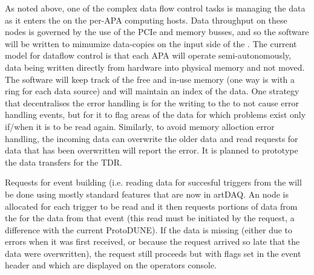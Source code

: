 As noted above, one of the complex data flow control tasks is managing
the data as it enters the  on the per-APA 
computing hosts. 
Data throughput on these nodes is governed by the use of the PCIe and
memory busses, and so the software will be written to mimumize
data-copies on the input side of the .
The current model for dataflow control is that each APA will operate
semi-autonomously, data being written directly from hardware into physical
memory and not moved. 
The software will keep track of the free and in-use memory (one way is
with a ring for each data source) and will maintain an index of the
data. 
One strategy that decentralises the error handling is for the writing
to the  to not cause error handling events, but
for it to flag areas of the data for which problems exist only if/when
it is to be read again. 
Similarly, to avoid memory alloction error handling, the incoming data
can overwrite the older data and read requests for data that has been
overwritten will report the error. 
It is planned to prototype the data transfers for the TDR.

Requests for event building
(i.e. reading data for succesful triggers from the 
will be done using mostly standard features that are now in artDAQ. 
An  node is allocated for each trigger to be read and it
then requests portions of data from the  for the
data from that event (this read must be initiated by the request, a
difference with the current ProtoDUNE).
If the data is missing (either due to errors when it was first
received, or because the request arrived so late that the data were
overwritten), the request still proceeds but with flags set in the event
header and which are displayed on the operators console.

